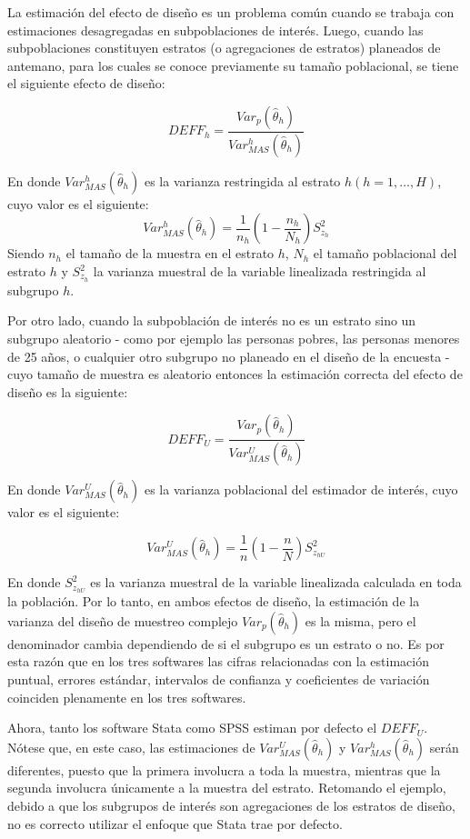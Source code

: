 La estimación del efecto de diseño es un problema común cuando se trabaja con estimaciones desagregadas en subpoblaciones de interés. Luego, cuando las subpoblaciones constituyen estratos (o agregaciones de estratos) planeados de antemano, para los cuales se conoce previamente su tamaño poblacional, se tiene el siguiente efecto de diseño:

\[
DEFF_h= \frac{Var_p (\hat\theta_h) }{Var_{MAS}^h(\hat\theta_h) }
\]

En donde \(Var_{MAS}^h(\hat\theta_h)\) es la varianza restringida al estrato \(h (h=1,\ldots, H)\), cuyo valor es el siguiente:
\[
Var_{MAS}^h(\hat\theta_h)=\frac{1}{n_h}\left(1-\frac{n_h}{N_h}\right)S_{z_h}^2
\]
Siendo \(n_h\) el tamaño de la muestra en el estrato \(h\), \(N_h\) el tamaño poblacional del estrato \(h\) y \(S_{z_h}^2\) la varianza muestral de la variable linealizada restringida al subgrupo \(h\).

Por otro lado, cuando la subpoblación de interés no es un estrato sino un subgrupo aleatorio - como por ejemplo las personas pobres, las personas menores de 25 años, o cualquier otro subgrupo no planeado en el diseño de la encuesta - cuyo tamaño de muestra es aleatorio entonces la estimación correcta del efecto de diseño es la siguiente:

\[
DEFF_U= \frac{Var_p (\hat\theta_h) }{Var_{MAS}^U(\hat\theta_h) }
\]

En donde \(Var_{MAS}^U(\hat\theta_h)\) es la varianza poblacional del estimador de interés, cuyo valor es el siguiente:

\[
Var_{MAS}^U(\hat\theta_h)=\frac{1}{n}\left(1-\frac{n}{N}\right)S_{z_{hU}}^2
\]

En donde \(S_{z_{hU}}^2\) es la varianza muestral de la variable linealizada calculada en toda la población. Por lo tanto, en ambos efectos de diseño, la estimación de la varianza del diseño de muestreo complejo \(Var_p (\hat\theta_h)\) es la misma, pero el denominador cambia dependiendo de si el subgrupo es un estrato o no. Es por esta razón que en los tres softwares las cifras relacionadas con la estimación puntual, errores estándar, intervalos de confianza y coeficientes de variación coinciden plenamente en los tres softwares.

Ahora, tanto los software Stata como SPSS estiman por defecto el \(DEFF_U\). Nótese que, en este caso, las estimaciones de \(Var_{MAS}^U(\hat\theta_h)\) y \(Var_{MAS}^h(\hat\theta_h)\) serán diferentes, puesto que la primera involucra a toda la muestra, mientras que la segunda involucra únicamente a la muestra del estrato. Retomando el ejemplo, debido a que los subgrupos de interés son agregaciones de los estratos de diseño, no es correcto utilizar el enfoque que Stata trae por defecto.

